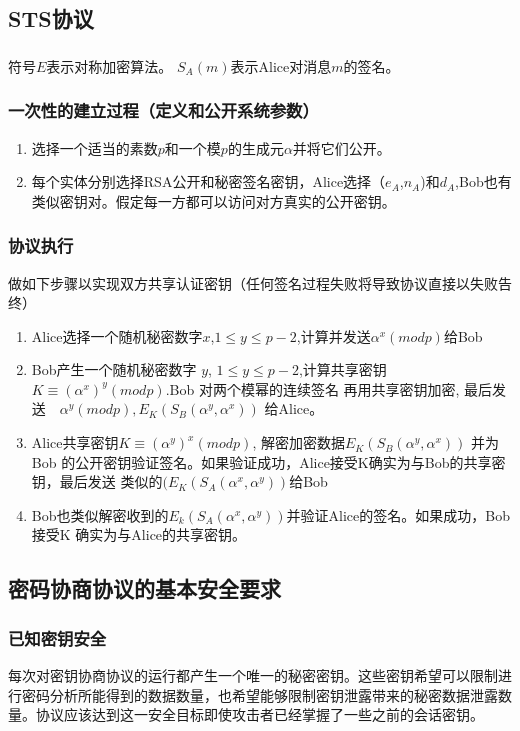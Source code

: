 \documentclass[11pt,a4paper]{article}
\begin{document}
\subsection{STS协议}
\subsubsection{}符号$E$表示对称加密算法。 $S_A(m)$表示Alice对消息$m$的签名。
\subsubsection{一次性的建立过程（定义和公开系统参数）}
\begin{enumerate}
\item 选择一个适当的素数$p$和一个模$p$的生成元$\alpha$并将它们公开。
\item 每个实体分别选择RSA公开和秘密签名密钥，Alice选择（$e_A$,$n_A$)和$d_A$,Bob也有类似密钥对。假定每一方都可以访问对方真实的公开密钥。
\end{enumerate}
\subsubsection{协议执行} 做如下步骤以实现双方共享认证密钥（任何签名过程失败将导致协议直接以失败告终）
\begin{enumerate}
\item Alice选择一个随机秘密数字$x$,$1\le y \le p-2$,计算并发送$\alpha^x(mod p)$给Bob

\item Bob产生一个随机秘密数字 $y$, $1\le y \le p-2$,计算共享密钥$K\equiv (\alpha^x)^y(mod p)$.Bob 对两个模幂的连续签名 再用共享密钥加密, 最后发送　$\alpha^y(mod p), E_K(S_B(\alpha^y, \alpha^x))$ 给Alice。
\item Alice共享密钥$K\equiv (\alpha^y)^x(mod p)$, 解密加密数据$E_K(S_B(\alpha^y, \alpha^x))$ 并为Bob 的公开密钥验证签名。如果验证成功，Alice接受K确实为与Bob的共享密钥，最后发送 类似的$(E_K(S_A(\alpha^x, \alpha^y))$给Bob
\item Bob也类似解密收到的$E_k(S_A(\alpha^x, \alpha^y))$并验证Alice的签名。如果成功，Bob接受K 确实为与Alice的共享密钥。
\end{enumerate}
\subsection{密码协商协议的基本安全要求}
\subsubsection{已知密钥安全} 每次对密钥协商协议的运行都产生一个唯一的秘密密钥。这些密钥希望可以限制进行密码分析所能得到的数据数量，也希望能够限制密钥泄露带来的秘密数据泄露数量。协议应该达到这一安全目标即使攻击者已经掌握了一些之前的会话密钥。
\end{document}
